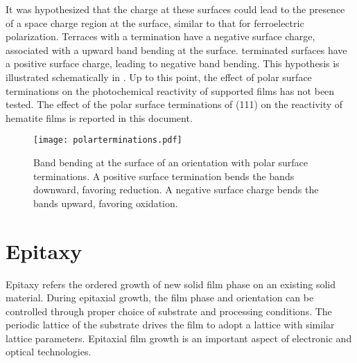 It was hypothesized that the charge at these surfaces could lead to the presence of a space charge region at the surface, similar to that for ferroelectric polarization. Terraces with a  termination have a negative surface charge, associated with a upward band bending at the surface.  terminated surfaces have a positive surface charge, leading to negative band bending. This hypothesis is illustrated schematically in . Up to this point, the effect of polar surface terminations on the photochemical reactivity of supported films has not been tested. The effect of the polar surface terminations of (111)  on the reactivity of hematite films is reported in this document.
\begin{figure}
	\centerline{\texttt{[image: polarterminations.pdf]}}
	\caption[Band bending arising from polar surface terminations]{%
		Band bending at the surface of an orientation with polar surface 
		terminations. A positive surface termination bends the bands 
		downward, favoring reduction. A negative surface charge bends the 
		bands upward, favoring oxidation.}
	\label{fig:polarterminations}
\end{figure}


\section{Epitaxy}
\label{sec:background.epitaxy}


Epitaxy refers the ordered growth of new solid film phase on an existing solid material.\cite{Opel:2012ge,Herman:2004to,Hooks:2001vy} During epitaxial growth, the  film phase and orientation can be controlled through proper choice of substrate and processing conditions. The periodic lattice of the substrate drives the film to adopt a lattice with similar lattice parameters. Epitaxial film growth is an important aspect of electronic and optical technologies.


